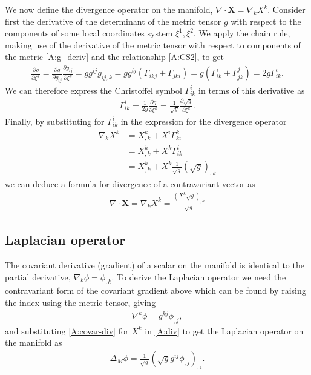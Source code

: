 We now define the divergence operator on the manifold,
$\nabla\cdot \bm{X} = \nabla_k X^k$. Consider first the derivative of the 
determinant of the metric tensor $g$ with respect to 
the components of some local coordinates system $\xi^1,\xi^2$. We apply the 
chain rule, making use of the derivative of the metric tensor with respect to 
components of the metric \eqref{A:g_deriv} and the relationship \eqref{A:CS2}, 
to get
\begin{align}
    \frac{\partial g}{\partial \xi^k} = \frac{\partial g}{\partial g_{ij}}\frac{\partial g_{ij}}{\partial \xi^k} = 
    gg^{ij}g_{ij,k} = gg^{ij}(\Gamma_{ikj} + \Gamma_{jki}) = g(\Gamma_{ik}^i + \Gamma_{jk}^j) = 2g\Gamma_{ik}^i.
    \label{A:g_deriv2}
\end{align}
We can therefore express the Christoffel symbol $\Gamma_{ik}^i$ in terms of this
derivative as
\begin{align}
    \Gamma_{ik}^i = \frac{1}{2g}\frac{\partial g}{\partial \xi^k} = \frac{1}{\sqrt{g}}\frac{\partial\sqrt{g}}{\partial \xi^k}.
    \label{A:G_ik^i}
\end{align}
Finally, by substituting for $\Gamma_{ik}^i$ in the expression for the 
divergence operator
\begin{align*}
 \nabla_k X^k &= X^k_{,k} + X^i\Gamma_{ki}^k \\ 
              &= X^k_{,k} + X^k\Gamma_{ik}^i \\
              &= X^k_{,k} + X^k\frac{1}{\sqrt{g}}(\sqrt{g})_{,k}
\end{align*}
we can deduce a formula for divergence of a contravariant vector as
\begin{align}
\nabla\cdot \bm{X} = \nabla_k X^k = \frac{\left(X^k\sqrt{g}\right)_{,k}}{\sqrt{g}}
\label{A:div}
\end{align}


\subsection{Laplacian operator} 
The covariant derivative (gradient) of a scalar on the manifold is identical to
the partial derivative, $\nabla_k \phi = \phi_{,k}$.
To derive the Laplacian operator we need the contravariant form of the covariant
gradient above which can be found by raising the index using the metric tensor,
giving
\begin{align}
    \nabla^k \phi = g^{kj}\phi_{,j},
    \label{A:covar-div}
\end{align}
and substituting \eqref{A:covar-div} for $X^k$ in \eqref{A:div} to get the Laplacian operator
on the manifold as
\begin{align}
    \Delta_M\phi = \frac{1}{\sqrt{g}}\left(\sqrt{g}g^{ij}\phi_{,j}\right)_{,i}.
    \label{A:surf_lapl}
\end{align}


